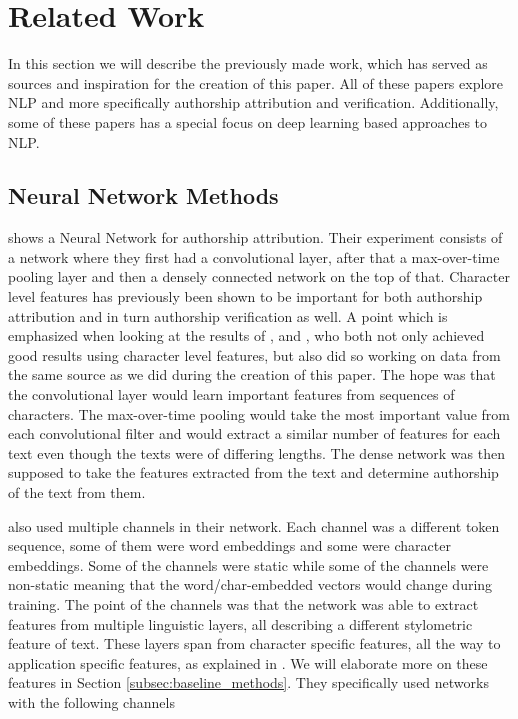 \section{Related Work} \label{sec:related_work}


In this section we will describe the previously made work,
which has served as sources and inspiration for the creation of this paper.
All of these papers explore \gls{NLP} and more specifically authorship
attribution and verification. Additionally, some of these papers has a
special focus on deep learning based approaches to \gls{NLP}.

\subsection{Neural Network Methods}

\citet{DBLP:journals/corr/RuderGB16c} shows a Neural Network for authorship
attribution. Their experiment consists of a network where they first had
a convolutional layer, after that a max-over-time pooling layer and then a
densely connected network on the top of that. Character level features has
previously been shown to be important for both authorship attribution and in
turn authorship verification as well. A point which is emphasized when looking
at the results of \citet{hansen2014}, and \citet{aalykke2016}, who both not only
achieved good results using character level features, but also did so working on
data from the same source as we did during the creation of this paper. The hope
was that the convolutional layer would learn important features from sequences
of characters. The max-over-time pooling would take the most important value
from each convolutional filter and would extract a similar number of features
for each text even though the texts were of differing lengths. The dense network
was then supposed to take the features extracted from the text and determine
authorship of the text from them.

\citet{DBLP:journals/corr/RuderGB16c} also used multiple channels in their
network. Each channel was a different token sequence, some of them were word
embeddings and some were character embeddings. Some of the channels were static
while some of the channels were non-static meaning that the word/char-embedded
vectors would change during training. The point of the channels was that the
network was able to extract features from multiple linguistic layers, all
describing a different stylometric feature of text. These layers span from
character specific features, all the way to application specific features,
as explained in \citet[Section 2]{stamatos2009}. We will elaborate more on
these features in Section \ref{subsec:baseline_methods}. They specifically used
networks with the following channels

